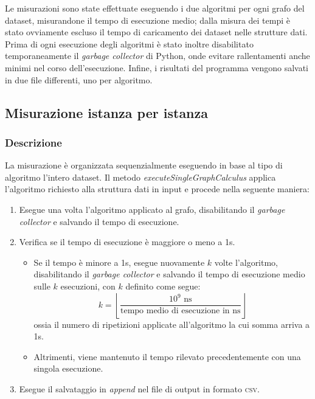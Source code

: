 Le misurazioni sono state effettuate eseguendo i due algoritmi per ogni grafo del dataset, misurandone il tempo di esecuzione medio; dalla misura dei tempi è stato ovviamente escluso il tempo di caricamento dei dataset nelle strutture dati. Prima di ogni esecuzione degli algoritmi è stato inoltre disabilitato temporaneamente il \textit{garbage collector} di Python, onde evitare rallentamenti anche minimi nel corso dell'esecuzione. Infine, i risultati del programma vengono salvati in due file differenti, uno per algoritmo.

\subsection{Misurazione istanza per istanza}

\subsubsection{Descrizione} 
\label{guida_misurazioni}

La misurazione è organizzata sequenzialmente eseguendo in base al tipo di algoritmo l'intero dataset. Il metodo \textit{executeSingleGraphCalculus} applica l'algoritmo richiesto alla struttura dati in input e procede nella seguente maniera:

\begin{enumerate}
    \item Esegue una volta l'algoritmo applicato al grafo, disabilitando il \textit{garbage collector} e salvando il tempo di esecuzione.
    \item Verifica se il tempo di esecuzione è maggiore o meno a 1s.
    \begin{itemize}
        \item Se il tempo è minore a 1s, esegue nuovamente \(k\) volte l'algoritmo, disabilitando il \textit{garbage collector} e salvando il tempo di esecuzione medio sulle \(k\) esecuzioni, con \(k\) definito come segue:  \[ k = \left\lfloor\frac{10^9 \textrm{ ns}}{\textrm{tempo medio di esecuzione in ns}}\right\rfloor\]
        ossia il numero di ripetizioni applicate all'algoritmo la cui somma arriva a 1s.
        \item Altrimenti, viene mantenuto il tempo rilevato precedentemente con una singola esecuzione.
    \end{itemize}
    \item Esegue il salvataggio in \textit{append} nel file di output in formato \textsc{csv}.
\end{enumerate}



